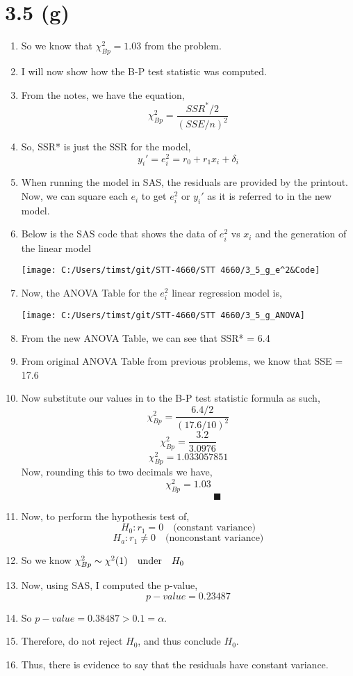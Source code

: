 \documentclass{article}
\begin{document}
\section*{3.5 (g)}
	\begin{enumerate}[label = \arabic*)]
		\item So we know that $\chi_{Bp}^2 = 1.03$ from the problem.
		\item I will now show how the B-P test statistic was computed.
		\item From the notes, we have the equation,
		\[\chi_{Bp}^2 = \frac{SSR^*/2}{(SSE/n)^2}\]
		\item So, SSR* is just the SSR for the model,
		\[y_i' = e_i^2 = r_0 +r_1x_i + \delta_i\]
		\item When running the model in SAS, the residuals are provided by the printout.
		Now, we can square each $e_i$ to get $e_i^2$ or $y_i'$ as it is referred to in the new model.
		\item Below is the SAS code that shows the data of $e_i^2$ vs $x_i$ and the generation of the linear model
		
		\texttt{[image: C:/Users/timst/git/STT-4660/STT 4660/3\_5\_g\_e^2\&Code]}
		\item Now, the ANOVA Table for the $e_i^2$ linear regression model is,
		
		\texttt{[image: C:/Users/timst/git/STT-4660/STT 4660/3\_5\_g\_ANOVA]}
		\item From the new ANOVA Table, we can see that SSR* = 6.4
		\item From original ANOVA Table from previous problems, we know that SSE = 17.6
		\item Now substitute our values in to the B-P test statistic formula as such,
		\[\chi_{Bp}^2 = \frac{6.4/2}{(17.6/10)^2}\]
		\[\chi_{Bp}^2 = \frac{3.2}{3.0976}\]
		\[\chi_{Bp}^2 = 1.033057851\]
		Now, rounding this to two decimals we have,
		\[\chi_{Bp}^2 = 1.03\]
		\[\qquad \qquad \qquad \blacksquare \]
		\item Now, to perform the hypothesis test of,
		\[H_0: r_1 = 0 \quad \text{(constant variance)}\]
		\[H_a: r_1 \neq 0 \quad \text{(nonconstant variance)}\]
		\item So we know $\chi_{Bp}^2 \thicksim \chi^2(1) \quad \text{under} \quad H_0$
		\item Now, using SAS, I computed the p-value,
		\[p-value = 0.23487\]
		\item So $p-value = 0.38487 > 0.1 = \alpha$.
		\item Therefore, do not reject $H_0$, and thus conclude $H_0$.
		\item Thus, there is evidence to say that the residuals have constant variance.
	\end{enumerate}
\end{document}

